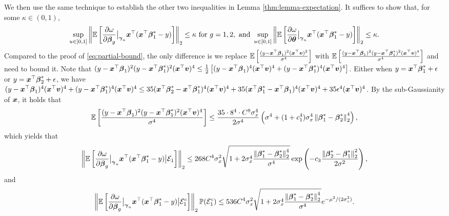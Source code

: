 We then use the same technique to  establish the other two inequalities in Lemma \ref{thm:lemma-expectation}. 
It suffices to show that, for some $\kappa \in (0, 1)$,
\[\sup_{u \in [0, 1]}\norm{\EE\left[\frac{\partial\omega}{\partial \bbeta_g}\big|_{\bgamma_{u}}\bx^{\top} ( \bx^\top \bbeta_1^* - y)\right]}_2 \leq \kappa \text{ for } g=1, 2, \text{ and } \sup_{u \in [0, 1]}\norm{\EE\left[\frac{\partial\omega}{\partial \btheta}\big|_{\bgamma_{u}}\bx^\top ( \bx^\top \bbeta_1^* - y)\right]}_2 \leq \kappa.\]
Compared to the proof of \eqref{eq:partial-bound}, the only difference is we replace $\EE\brackets{\frac{(y-\bx^{\top}\bbeta_1)^2(\bx^{\top}\bv)^2}{\sigma^4}}$ with
$\EE\brackets{\frac{(y-\bx^{\top}\bbeta_1)^2(y-\bx^{\top}\bbeta_1^*)^2(\bx^{\top}\bv)^4}{\sigma^4}}$ and need to bound it. Note that $(y-\bx^{\top}\bbeta_1)^2(y-\bx^{\top}\bbeta_1^*)^2(\bx^{\top}\bv)^4 \leq \frac{1}{2}\brackets{(y-\bx^{\top}\bbeta_1)^4(\bx^{\top}\bv)^4 + (y-\bx^{\top}\bbeta_1^*)^4 (\bx^{\top}\bv)^4}$. Either when $y=\bx^{\top}\bbeta^*_1+\epsilon$ or $y=\bx^{\top}\bbeta^*_2+\epsilon$, we have $(y-\bx^{\top}\bbeta_1)^4(\bx^{\top}\bv)^4 + (y-\bx^{\top}\bbeta_1^*)^4 (\bx^{\top}\bv)^4 \leq 35(\bx^{\top}\bbeta_2^*-\bx^{\top}\bbeta_1^*)^4(\bx^{\top}\bv)^4+35 (\bx^{\top}\bbeta_1^*-\bx^{\top}\bbeta_1)^4(\bx^{\top}\bv)^4 + 35\epsilon^4(\bx^{\top}\bv)^4$. By the sub-Gaussianity of $\bx$, it holds that \[\EE\brackets{\frac{(y-\bx^{\top}\bbeta_1)^2(y-\bx^{\top}\bbeta_1^*)^2(\bx^{\top}\bv)^4}{\sigma^4}} \leq \frac{35\cdot 8^4 \cdot C^8\sigma_x^4}{2\sigma^4} \left(\sigma^4+(1+c_1^4)\sigma_x^4\norm{\bbeta_1^*-\bbeta_2^*}_2^4\right),\] 
which yields that 
\[\norm{\EE\left[\frac{\partial\omega}{\partial \bbeta_g}\big|_{\bgamma_{u}}\bx^{\top} ( \bx^\top \bbeta_1^* - y) \big| \cE_1 \right]}_2  \leq 268C^4\sigma_x^2\sqrt{ 1+2\sigma_x^4\frac{\norm{\bbeta_1^*-\bbeta_2^*}_2^4}{\sigma^4}}\exp\paren{-c_3\frac{\norm{\bbeta_2^*-\bbeta^*_1}^2_{2}}{2\sigma^2}},\]
and 
\[\norm{\EE\left[\frac{\partial\omega}{\partial \bbeta_g}\big|_{\bgamma_{u}}\bx^{\top} ( \bx^\top \bbeta_1^* - y) \big| \cE_1^c \right]}_2 \PP(\cE_1^c) \leq 536C^4\sigma_x^2\sqrt{ 1+2\sigma_x^4\frac{\norm{\bbeta_1^*-\bbeta_2^*}_2^4}{\sigma^4}}e^{-\mu^2/(2\sigma_z^2)}.\]
